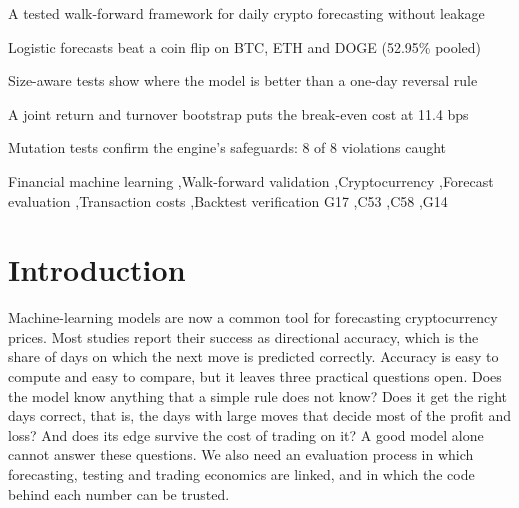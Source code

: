 \documentclass[preprint,12pt,authoryear,a4paper]{elsarticle}
\begin{document}
\begin{frontmatter}
\begin{highlights}
\item A tested walk-forward framework for daily crypto forecasting without leakage
\item Logistic forecasts beat a coin flip on BTC, ETH and DOGE (52.95\% pooled)
\item Size-aware tests show where the model is better than a one-day reversal rule
\item A joint return and turnover bootstrap puts the break-even cost at 11.4 bps
\item Mutation tests confirm the engine's safeguards: 8 of 8 violations caught
\end{highlights}

\begin{keyword}
Financial machine learning \sep Walk-forward validation \sep Cryptocurrency
\sep Forecast evaluation \sep Transaction costs \sep Backtest verification
\JEL G17 \sep C53 \sep C58 \sep G14
\end{keyword}

\end{frontmatter}

\section{Introduction}\label{sec:intro}

Machine-learning models are now a common tool for forecasting cryptocurrency
prices. Most studies report their success as directional accuracy, which is the
share of days on which the next move is predicted correctly. Accuracy is easy to
compute and easy to compare, but it leaves three practical questions open. Does the
model know anything that a simple rule does not know? Does it get the right days
correct, that is, the days with large moves that decide most of the profit and
loss? And does its edge survive the cost of trading on it? A good model alone cannot
answer these questions. We also need an evaluation process in which forecasting,
testing and trading economics are linked, and in which the code behind each number
can be trusted.
\end{document}
